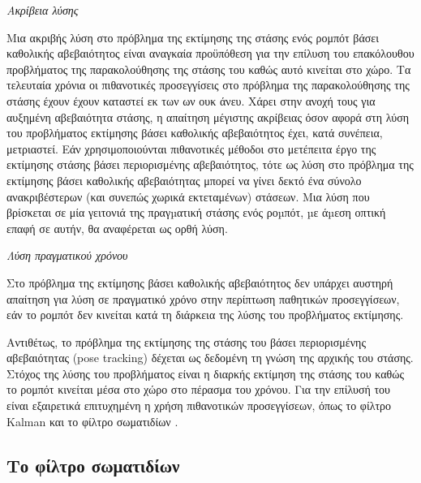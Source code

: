 \begin{gg_box}
\begin{remark}
  \label{remark:01_01_02_02:01}
  \textit{Ακρίβεια λύσης}

  Μια ακριβής λύση στο πρόβλημα της εκτίμησης της στάσης ενός ρομπότ βάσει
  καθολικής αβεβαιότητος είναι αναγκαία προϋπόθεση για την επίλυση του
  επακόλουθου προβλήματος της παρακολούθησης της στάσης του καθώς αυτό κινείται
  στο χώρο. Τα τελευταία χρόνια οι πιθανοτικές προσεγγίσεις στο πρόβλημα της
  παρακολούθησης της στάσης έχουν έχουν καταστεί εκ των ων ουκ άνευ. Χάρει στην
  ανοχή τους για αυξημένη αβεβαιότητα στάσης, η απαίτηση μέγιστης ακρίβειας
  όσον αφορά στη λύση του προβλήματος εκτίμησης βάσει καθολικής αβεβαιότητος
  έχει, κατά συνέπεια, μετριαστεί. Εάν χρησιμοποιούνται πιθανοτικές μέθοδοι στο
  μετέπειτα έργο της εκτίμησης στάσης βάσει περιορισμένης αβεβαιότητος, τότε ως
  λύση στο πρόβλημα της εκτίμησης βάσει καθολικής αβεβαιότητας μπορεί να γίνει
  δεκτό ένα σύνολο ανακριβέστερων (και συνεπώς χωρικά εκτεταμένων) στάσεων. Μια
  λύση που βρίσκεται σε μία γειτονιά της πραγµατική στάσης ενός ροµπότ, µε
  άµεση οπτική επαφή σε αυτήν, θα αναφέρεται ως ορθή λύση.
\end{remark}
\end{gg_box}


\begin{gg_box}
\begin{remark}
  \textit{Λύση πραγματικού χρόνου}
  \label{remark:01_01_02_02:02}

  Στο πρόβλημα της εκτίμησης βάσει καθολικής αβεβαιότητος δεν υπάρχει αυστηρή
  απαίτηση για λύση σε πραγματικό χρόνο στην περίπτωση παθητικών προσεγγίσεων,
  εάν το ρομπότ δεν κινείται κατά τη διάρκεια της λύσης του προβλήματος
  εκτίμησης.
\end{remark}
\end{gg_box}

Αντιθέτως, το πρόβλημα της εκτίμησης της στάσης του βάσει περιορισμένης
αβεβαιότητας (pose tracking) δέχεται ως δεδομένη τη γνώση της αρχικής του
στάσης. Στόχος της λύσης του προβλήματος είναι η διαρκής εκτίμηση της στάσης
του καθώς το ρομπότ κινείται μέσα στο χώρο στο πέρασμα του χρόνου. Για την
επίλυσή του είναι εξαιρετικά επιτυχημένη η χρήση πιθανοτικών προσεγγίσεων, όπως
το φίλτρο Kalman \cite{Maybeck1979} και το φίλτρο σωματιδίων
\cite{Thrun2002a,Gustafsson2002}.

\subsection{Το φίλτρο σωματιδίων}
\label{subsec:01_01_02_3}

